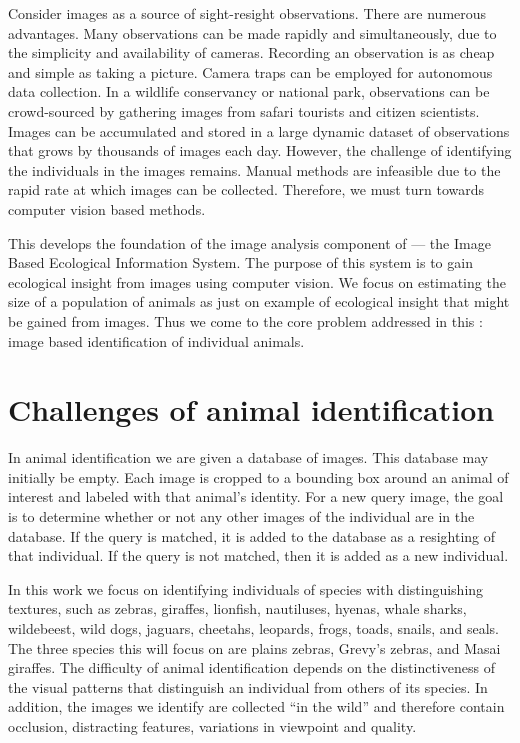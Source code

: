     Consider images as a source of sight-resight observations.
    There are numerous advantages.
    Many observations can be made rapidly and simultaneously, due to
      the simplicity and availability of cameras.
    Recording an observation is as cheap and simple as taking a
      picture.
    Camera traps can be employed for autonomous data collection.
    In a wildlife conservancy or national park, observations can be
      crowd-sourced by gathering images from safari tourists and citizen
      scientists.
    Images can be accumulated and stored in a large dynamic dataset of
      observations that grows by thousands of images each day.
    However, the challenge of identifying the individuals in the images
      remains.
    Manual methods are infeasible due to the rapid rate at which images
      can be collected.
    Therefore, we must turn towards computer vision based methods.

    This \thesis{} develops the foundation of the image analysis
      component of \IBEIS{} --- the Image Based Ecological Information
      System.
    The purpose of this system is to gain ecological insight from
      images using computer vision.
    We focus on estimating the size of a population of animals as just
      on example of ecological insight that might be gained from images.
    Thus we come to the core problem addressed in this \thesis{}:
    image based identification of individual animals.

\section{Challenges of animal identification}\label{sec:challenges}

    In animal identification we are given a database of images.
    This database may initially be empty.
    Each image is cropped to a bounding box around an animal of
      interest and labeled with that animal's identity.
    For a new query image, the goal is to determine whether or not any
      other images of the individual are in the database.
    If the query is matched, it is added to the database as a
      resighting of that individual.
    If the query is not matched, then it is added as a new individual.

    In this work we focus on identifying individuals of species with
      distinguishing textures, such as zebras, giraffes, lionfish,
      nautiluses, hyenas, whale sharks, wildebeest, wild dogs, jaguars,
      cheetahs, leopards, frogs, toads, snails, and seals.
    The three species this \thesis{} will focus on are plains zebras,
      Grevy's zebras, and Masai giraffes.
    The difficulty of animal identification depends on the
      distinctiveness of the visual patterns that distinguish an
      individual from others of its species.
    In addition, the images we identify are collected ``in the wild''
      and therefore contain occlusion, distracting features, variations
      in viewpoint and quality.

